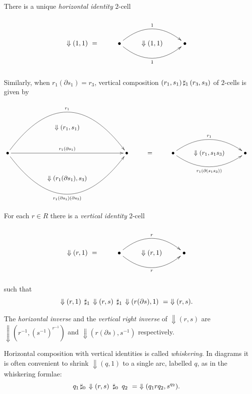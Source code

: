 \noindent
There is a unique \emph{horizontal identity} $2$-cell
$$
\xy
\xymatrix{
   & & & \\
 \Downarrow(1,1)~=
   & \bullet  \ar@/^5ex/[rr]^{1} 
             \ar@/_5ex/[rr]_{1} 
     & \Downarrow (1,1)
        & \bullet \\
   & & & \\
}
\endxy
$$

\noindent
Similarly, when $r_1(\partial s_1) = r_3$,
vertical composition $(r_1,s_1) \,\sharp_1\, (r_3,s_3)$ 
of $2$-cells is given by
$$
\xy
\xymatrix{
  && && & & && \\
  && \Downarrow (r_1,s_1)
     && & & && \\
  \bullet \ar@/^15ex/[rrrr]^{r_1} 
          \ar[rrrr]^{r_1(\partial s_1)}
          \ar@/_15ex/[rrrr]_{r_1(\partial s_1)(\partial s_3)} 
  && && \bullet 
        &=& \bullet \ar@/^5ex/[rr]^{r_1} 
                    \ar@/_5ex/[rr]_{r_1(\partial(s_1s_3))} 
            & \Downarrow (r_1,s_1s_3)
             & \bullet \\
  && \Downarrow (r_1(\partial s_1),s_3)
     && & & && \\
  && && & & && \\
}
\endxy
$$

\medskip\noindent
For each $r \in R$ there is a \emph{vertical identity} $2$-cell 
$$
\xy
\xymatrix{
   & & & \\
 \Downarrow(r,1)~=
   & \bullet  \ar@/^5ex/[rr]^{r} 
             \ar@/_5ex/[rr]_{r} 
     & \Downarrow (r,1)
        & \bullet \\
   & & & \\
}
\endxy
$$
such that
$$
\Downarrow(r,1)\; \,\sharp_1\, \Downarrow(r,s)\; 
                  \,\sharp_1\, \Downarrow(r(\partial s),1)
~=~ \Downarrow(r,s).
$$

The \emph{horizontal inverse} and the 
\emph{vertical right inverse} of $\Downarrow(r,s)$ 
are $\Downarrow(r^{-1},(s^{-1})^{r^{-1}})$ 
and $\Downarrow(r(\partial s),s^{-1})$ respectively.

Horizontal composition with vertical identities is called 
\emph{whiskering}. 
In diagrams it is often convenient to shrink $\Downarrow(q,1)$ 
to a single arc, labelled $q$, as in the whiskering formlae:
$$
q_1 \,\sharp_0\, \Downarrow(r,s) ~\,\sharp_0\,~ q_2 
~=~ \Downarrow(q_1rq_2,{s}^{q_2}).
$$

